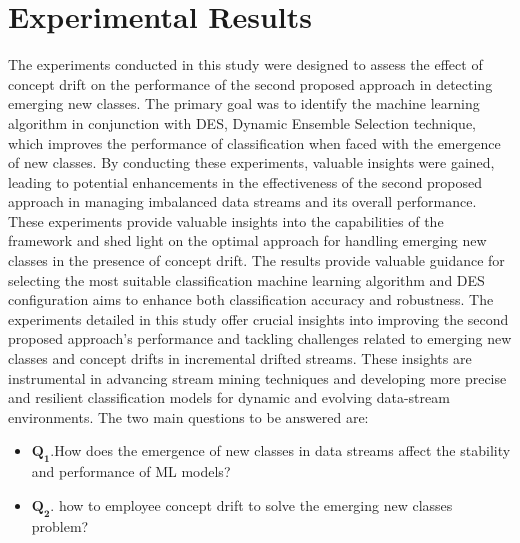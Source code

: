 \section{Experimental Results}
\label{sec:results}
The experiments conducted in this study were designed to assess the effect of concept drift on the performance of the second proposed approach in detecting emerging new classes. The primary goal was to identify the machine learning algorithm in conjunction with DES, Dynamic Ensemble Selection technique, which improves the performance of classification when faced with the emergence of new classes. By conducting these experiments, valuable insights were gained, leading to potential enhancements in the effectiveness of the second proposed approach in managing imbalanced data streams and its overall performance. These experiments provide valuable insights into the capabilities of the framework and shed light on the optimal approach for handling emerging new classes in the presence of concept drift. The results provide valuable guidance for selecting the most suitable classification machine learning algorithm and DES configuration aims to enhance both classification accuracy and robustness. The experiments detailed in this study offer crucial insights into improving the second proposed approach's performance and tackling challenges related to emerging new classes and concept drifts in incremental drifted streams. These insights are instrumental in advancing stream mining techniques and developing more precise and resilient classification models for dynamic and evolving data-stream environments. The two main questions to be answered are:

\begin{itemize}
  
  \item $\pmb{Q_1}$.How does the emergence of new classes in data streams affect the stability and performance of ML models?
  \item $\pmb{Q_2}$. how to employee concept drift to solve the emerging new classes problem? 
  \end{itemize}

